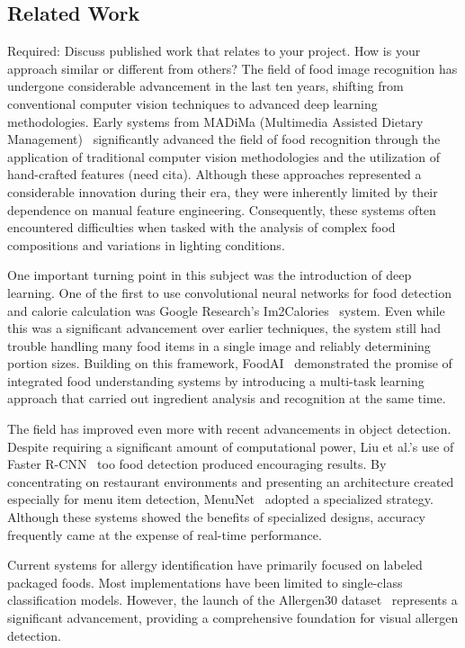 \documentclass[10pt,twocolumn,letterpaper]{article}
\begin{document}
\subsection{Related Work}

Required: Discuss published work that relates to your project. How is your approach similar or different from others?
The field of food image recognition has undergone considerable advancement in the last ten years, shifting from conventional computer vision techniques to advanced deep learning methodologies. 
Early systems from MADiMa (Multimedia Assisted Dietary Management)~\cite{madima2017} significantly advanced the field of food recognition through the application of traditional computer vision methodologies and the utilization of hand-crafted features (need cita). 
Although these approaches represented a considerable innovation during their era, they were inherently limited by their dependence on manual feature engineering. 
Consequently, these systems often encountered difficulties when tasked with the analysis of complex food compositions and variations in lighting conditions.

One important turning point in this subject was the introduction of deep learning. 
One of the first to use convolutional neural networks for food detection and calorie calculation was Google Research's Im2Calories~\cite{im2calories} system. 
Even while this was a significant advancement over earlier techniques, the system still had trouble handling many food items in a single image and reliably determining portion sizes. 
Building on this framework, FoodAI~\cite{foodai2024} demonstrated the promise of integrated food understanding systems by introducing a multi-task learning approach that carried out ingredient analysis and recognition at the same time.

The field has improved even more with recent advancements in object detection. Despite requiring a significant amount of computational power, Liu et al.'s use of Faster R-CNN~\cite{fasterrcnn} too food detection produced encouraging results. 
By concentrating on restaurant environments and presenting an architecture created especially for menu item detection, MenuNet~\cite{menunet} adopted a specialized strategy. 
Although these systems showed the benefits of specialized designs, accuracy frequently came at the expense of real-time performance.

Current systems for allergy identification have primarily focused on labeled packaged foods. 
Most implementations have been limited to single-class classification models. 
However, the launch of the Allergen30 dataset~\cite{mishra2022allergen30} represents a significant advancement, providing a comprehensive foundation for visual allergen detection.
\end{document}
